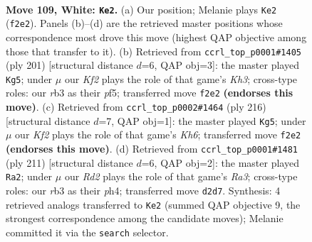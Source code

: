 \documentclass[11pt]{article}
\begin{document}
\begin{figure}[p]\centering
\begin{subfigure}{0.46\textwidth}\centering
\resizebox{\linewidth}{!}{%
\newchessgame
\chessboard[
  setfen={8/5k2/8/8/8/1r6/3R1K2/7r w - - 28 109},
  showmover=false,
  pgfstyle=straightmove, color=movearrow, markmove={f2-e2}
]}
\caption{}
\end{subfigure}\hfill
\begin{subfigure}{0.46\textwidth}\centering
\resizebox{\linewidth}{!}{%
\newchessgame
\chessboard[
  setfen={8/4R3/5p1k/5P2/7r/5K2/8/8 b - - 15 101},
  showmover=false,
  pgfstyle=straightmove, color=movearrow, markmove={h6-g5}
]}
\caption{}
\end{subfigure}
\\[4pt]
\begin{subfigure}{0.46\textwidth}\centering
\resizebox{\linewidth}{!}{%
\newchessgame
\chessboard[
  setfen={8/r7/5N1K/5R2/8/8/6k1/2r5 w - - 58 109},
  showmover=false,
  pgfstyle=straightmove, color=movearrow, markmove={h6-g5}
]}
\caption{}
\end{subfigure}\hfill
\begin{subfigure}{0.46\textwidth}\centering
\resizebox{\linewidth}{!}{%
\newchessgame
\chessboard[
  setfen={5K2/8/r1k5/8/7P/6p1/8/4R3 b - - 19 106},
  showmover=false,
  pgfstyle=straightmove, color=movearrow, markmove={a6-a2}
]}
\caption{}
\end{subfigure}
\caption{\textbf{Move 109, White: \texttt{Ke2}.} (a) Our position; Melanie plays \texttt{Ke2} (\texttt{f2e2}). Panels (b)--(d) are the retrieved master positions whose correspondence most drove this move (highest QAP objective among those that transfer to it). (b) Retrieved from \texttt{ccrl\_top\_p0001\#1405} (ply 201) [structural distance $d$=6, QAP obj=3]: the master played \texttt{Kg5}; under $\mu$ our \emph{Kf2} plays the role of that game's \emph{Kh3}; cross-type roles: our \emph{r}b3 as their \emph{p}f5; transferred move \texttt{f2e2} \textbf{(endorses this move)}. (c) Retrieved from \texttt{ccrl\_top\_p0002\#1464} (ply 216) [structural distance $d$=7, QAP obj=1]: the master played \texttt{Kg5}; under $\mu$ our \emph{Kf2} plays the role of that game's \emph{Kh6}; transferred move \texttt{f2e2} \textbf{(endorses this move)}. (d) Retrieved from \texttt{ccrl\_top\_p0001\#1481} (ply 211) [structural distance $d$=6, QAP obj=2]: the master played \texttt{Ra2}; under $\mu$ our \emph{Rd2} plays the role of that game's \emph{Ra3}; cross-type roles: our \emph{r}b3 as their \emph{p}h4; transferred move \texttt{d2d7}. Synthesis: 4 retrieved analogs transferred to \texttt{Ke2} (summed QAP objective 9, the strongest correspondence among the candidate moves); Melanie committed it via the \texttt{search} selector.}
\label{fig:thought-m216}
\end{figure}
\end{document}
